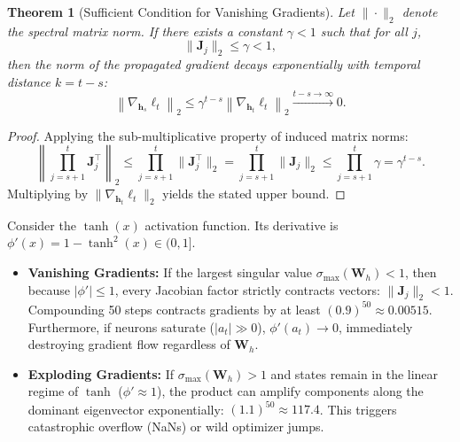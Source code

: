 \documentclass[11pt,a4paper]{article}
\theoremstyle{definition}
\theoremstyle{plain}
\newtheorem{theorem}{Theorem}[section]
\begin{document}
\begin{theorem}[Sufficient Condition for Vanishing Gradients]
Let $\|\cdot\|_2$ denote the spectral matrix norm. If there exists a constant $\gamma < 1$ such that for all $j$,
\begin{equation}
    \|\mathbf{J}_j\|_2 \le \gamma < 1,
\end{equation}
then the norm of the propagated gradient decays exponentially with temporal distance $k = t - s$:
\begin{equation}
    \left\| \nabla_{\mathbf{h}_s} \ell_t \right\|_2 \le \gamma^{t-s} \left\| \nabla_{\mathbf{h}_t} \ell_t \right\|_2 \xrightarrow{t-s \to \infty} 0.
\end{equation}
\end{theorem}

\begin{proof}
Applying the sub-multiplicative property of induced matrix norms:
\begin{equation}
    \left\| \prod_{j=s+1}^t \mathbf{J}_j^\top \right\|_2 \le \prod_{j=s+1}^t \|\mathbf{J}_j^\top\|_2 = \prod_{j=s+1}^t \|\mathbf{J}_j\|_2 \le \prod_{j=s+1}^t \gamma = \gamma^{t-s}.
\end{equation}
Multiplying by $\|\nabla_{\mathbf{h}_t} \ell_t\|_2$ yields the stated upper bound.
\end{proof}

\begin{intuitionbox}
Consider the $\tanh(x)$ activation function. Its derivative is $\phi'(x) = 1 - \tanh^2(x) \in (0, 1]$.
\begin{itemize}
    \item \textbf{Vanishing Gradients:} If the largest singular value $\sigma_{\max}(\mathbf{W}_h) < 1$, then because $|\phi'| \le 1$, every Jacobian factor strictly contracts vectors: $\|\mathbf{J}_j\|_2 < 1$. Compounding 50 steps contracts gradients by at least $(0.9)^{50} \approx 0.00515$. Furthermore, if neurons saturate ($|a_t| \gg 0$), $\phi'(a_t) \to 0$, immediately destroying gradient flow regardless of $\mathbf{W}_h$.
    \item \textbf{Exploding Gradients:} If $\sigma_{\max}(\mathbf{W}_h) > 1$ and states remain in the linear regime of $\tanh$ ($\phi' \approx 1$), the product can amplify components along the dominant eigenvector exponentially: $(1.1)^{50} \approx 117.4$. This triggers catastrophic overflow (NaNs) or wild optimizer jumps.
\end{itemize}
\end{intuitionbox}
\end{document}
